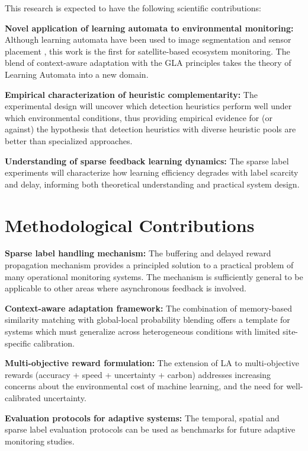 \documentclass[12pt,oneside]{book}
\begin{document}
This research is expected to have the following scientific contributions:

\textbf{Novel application of learning automata to environmental monitoring:} Although learning automata have been used to image segmentation \citep{Cuevas2011} and sensor placement \citep{BenZvi2018}, this work is the first for satellite-based ecosystem monitoring. The blend of context-aware adaptation with the GLA principles takes the theory of Learning Automata into a new domain.

\textbf{Empirical characterization of heuristic complementarity:} The experimental design will uncover which detection heuristics perform well under which environmental conditions, thus providing empirical evidence for (or against) the hypothesis that detection heuristics with diverse heuristic pools are better than specialized approaches.

\textbf{Understanding of sparse feedback learning dynamics:} The sparse label experiments will characterize how learning efficiency degrades with label scarcity and delay, informing both theoretical understanding and practical system design.

\section{Methodological Contributions}
\label{sec:methodological-contributions}

\textbf{Sparse label handling mechanism:} The buffering and delayed reward propagation mechanism provides a principled solution to a practical problem of many operational monitoring systems. The mechanism is sufficiently general to be applicable to other areas where asynchronous feedback is involved.

\textbf{Context-aware adaptation framework:} The combination of memory-based similarity matching with global-local probability blending offers a template for systems which must generalize across heterogeneous conditions with limited site-specific calibration.

\textbf{Multi-objective reward formulation:} The extension of LA to multi-objective rewards (accuracy + speed + uncertainty + carbon) addresses increasing concerns about the environmental cost of machine learning, and the need for well-calibrated uncertainty.

\textbf{Evaluation protocols for adaptive systems:} The temporal, spatial and sparse label evaluation protocols can be used as benchmarks for future adaptive monitoring studies.
\end{document}

